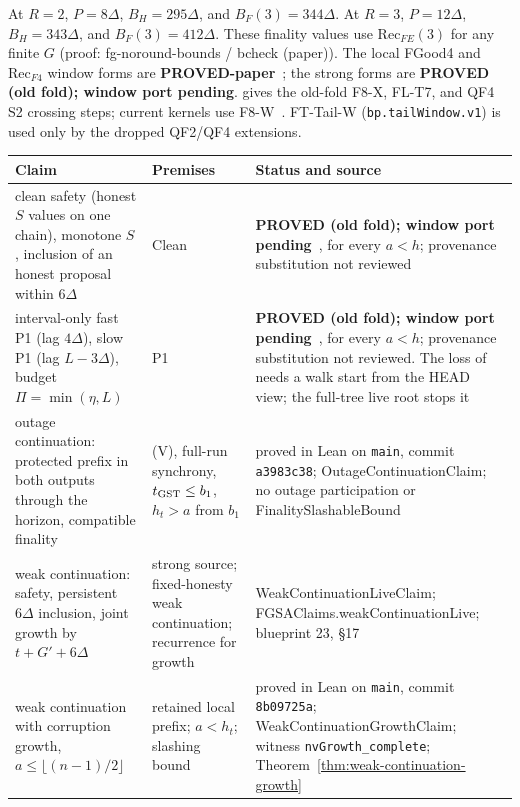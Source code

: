 \documentclass{article}
\theoremstyle{plain}
\theoremstyle{definition}
\theoremstyle{remark}
\newcommand{\LDP}[1]{\cite[\S#1]{LDP}}
\newcommand{\LV}[1]{\cite[\S#1]{LV}}
\begin{document}
At $R=2$, $P=8\Delta$, $B_H=295\Delta$, and $B_F(3)=344\Delta$.
At $R=3$, $P=12\Delta$, $B_H=343\Delta$, and $B_F(3)=412\Delta$.
These finality values use $\mathrm{Rec}_{FE}(3)$ for any finite $G$
(proof: fg-noround-bounds / bcheck (paper)).
The local FGood4 and $\mathrm{Rec}_{F4}$ window forms are
\textbf{PROVED-paper}~\cite[\S5]{FW}; the strong forms are
\textbf{PROVED (old fold); window port pending}.
 gives the old-fold F8-X, FL-T7, and QF4 S2
crossing steps; current kernels use F8-W~\cite[F1--F9]{BPF}.  FT-Tail-W (\texttt{bp.tailWindow.v1}) is used only by the dropped QF2/QF4 extensions.
\begin{center}
\footnotesize
\begin{longtable}{>{\raggedright\arraybackslash}p{5.4cm}
  >{\raggedright\arraybackslash}p{1.9cm}
  >{\raggedright\arraybackslash}p{5.6cm}}
\hline
Claim & Premises & Status and source\\
\hline
\endhead
clean safety (honest $S$ values on one chain), monotone $S$, inclusion
  of an honest proposal within $6\Delta$ & Clean &
  \textbf{PROVED (old fold); window port pending}~\cite[\S4]{FB}, for every $a<h$; provenance substitution not reviewed\\
interval-only fast P1 (lag $4\Delta$), slow P1 (lag $L-3\Delta$), budget
  $\Pi=\min(\eta,L)$ & P1 &
  \textbf{PROVED (old fold); window port pending}~\cite[\S4]{FB}, for every $a<h$; provenance substitution not reviewed.
  The loss of~\LV{3} needs a walk
  start from the HEAD view; the full-tree live root stops
  it~\LDP{10.1}\\
outage continuation: protected prefix in both outputs through the
  horizon, compatible finality & (V), full-run synchrony,
  $t_{\rm GST}\leq b_1$, $h_t>a$ from $b_1$ &
  proved in Lean on \texttt{main}, commit \texttt{a3983c38};
  \textsf{OutageContinuationClaim}; no outage participation or
  \textsf{FinalitySlashableBound}\\
weak continuation: safety, persistent $6\Delta$ inclusion, joint
  growth by $t+G'+6\Delta$ & strong source; fixed-honesty weak
  continuation; recurrence for growth &
  \textsf{WeakContinuationLiveClaim};
  \textsf{FGSAClaims.weakContinuationLive}; blueprint 23, \S17\\
weak continuation with corruption growth, $a\leq\lfloor(n-1)/2\rfloor$
  & retained local prefix; $a<h_t$; slashing bound &
  proved in Lean on \texttt{main}, commit \texttt{8b09725a};
  \textsf{WeakContinuationGrowthClaim}; witness \texttt{nvGrowth\_complete};
  Theorem~\ref{thm:weak-continuation-growth}\\

\end{longtable}
\end{center}
\end{document}
